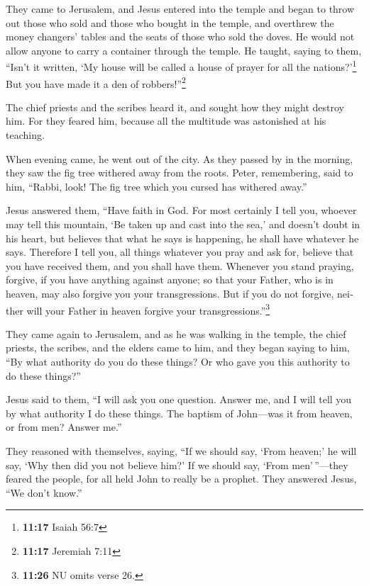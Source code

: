 \begin{paracol}{2}
\begin{otherlanguage}{english}
 They came to Jerusalem, and Jesus entered into the
temple and began to throw out those who sold and those who bought in the
temple, and overthrew the money changers' tables and the seats of those
who sold the doves.  He would not allow anyone to carry a
container through the temple.  He taught, saying to them,
``Isn't it written, `My house will be called a house of prayer for all
the nations?'\footnote{\textbf{11:17} Isaiah 56:7} But you have made it
a den of robbers!''\footnote{\textbf{11:17} Jeremiah 7:11}

 The chief priests and the scribes heard it, and sought
how they might destroy him. For they feared him, because all the
multitude was astonished at his teaching.

 When evening came, he went out of the city.
 As they passed by in the morning, they saw the fig tree
withered away from the roots.  Peter, remembering, said
to him, ``Rabbi, look! The fig tree which you cursed has withered
away.''

 Jesus answered them, ``Have faith in God.
 For most certainly I tell you, whoever may tell this
mountain, `Be taken up and cast into the sea,' and doesn't doubt in his
heart, but believes that what he says is happening, he shall have
whatever he says.  Therefore I tell you, all things
whatever you pray and ask for, believe that you have received them, and
you shall have them.  Whenever you stand praying,
forgive, if you have anything against anyone; so that your Father, who
is in heaven, may also forgive you your transgressions. 
But if you do not forgive, neither will your Father in heaven forgive
your transgressions.''\footnote{\textbf{11:26} NU omits verse 26.}

 They came again to Jerusalem, and as he was walking in
the temple, the chief priests, the scribes, and the elders came to him,
 and they began saying to him, ``By what authority do you
do these things? Or who gave you this authority to do these things?''

 Jesus said to them, ``I will ask you one question.
Answer me, and I will tell you by what authority I do these things.
 The baptism of John---was it from heaven, or from men?
Answer me.''

 They reasoned with themselves, saying, ``If we should
say, `From heaven;' he will say, `Why then did you not believe him?'
 If we should say, `From men'\,''---they feared the
people, for all held John to really be a prophet.  They
answered Jesus, ``We don't know.''


\end{otherlanguage}
\end{paracol}
